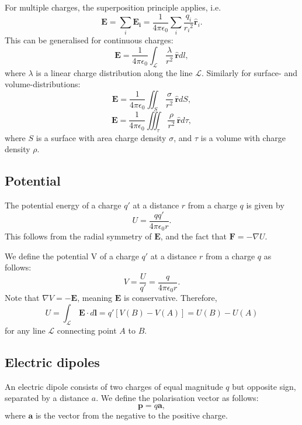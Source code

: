 \documentclass[a4paper, 12pt]{article}
\renewcommand{\vec}[1]{\mathbf{#1}}
\newcommand{\E}{\ensuremath{\vec{E}}}
\newcommand{\e}{\ensuremath{\epsilon_0}}
\let\tmp\hat
\renewcommand{\hat}[1]{\vec{\tmp{#1}}}
\begin{document}
    For multiple charges, the superposition principle applies, i.e. 
    \begin{equation}
        \E = \sum_i\vec{E_i} = \frac{1}{4\pi\e}\sum_i\frac{q_i}{{r_i}^2}\hat{r}_i.
    \end{equation}
    This can be generalised for continuous charges: 
    \begin{equation}
        \E = \frac{1}{4\pi\e}\int_\mathcal{L}\,\frac{\lambda}{r^2}\,\hat{r}dl,
    \end{equation}
    where $\lambda$ is a linear charge distribution along the line $\mathcal{L}$. Similarly for surface- and volume-distributions: 
    \begin{equation}
        \E = \frac{1}{4\pi\e}\iint_S\,\frac{\sigma}{r^2}\,\hat{r}dS,
    \end{equation}
    \begin{equation}
        \E = \frac{1}{4\pi\e}\iiint_{\tau}\,\frac{\rho}{r^2}\,\hat{r}d\tau,
    \end{equation}
    where $S$ is a surface with area charge density $\sigma$, and $\tau$ is a volume with charge density $\rho$.
    
\subsection{Potential}
    The potential energy of a charge $q'$ at a distance $r$ from a charge $q$ is given by
    \begin{equation}
        U = \frac{qq'}{4\pi\e r}.
    \end{equation}
    This follows from the radial symmetry of \E, and the fact that $\vec{F} = - \nabla U$.
    
    
    We define the potential V of a charge $q'$ at a distance $r$ from a charge $q$ as follows: 
    \begin{equation}
        V = \frac{U}{q'} = \frac{q}{4\pi\e r}.
    \end{equation}
    Note that $\nabla V = -\E$, meaning $\E$ is conservative. Therefore, 
    \begin{equation}
        U = \int_\mathcal{L}\,\E\cdot d\vec{l} = q'[V(B) - V(A)] = U(B) - U(A)
    \end{equation}
    for any line $\mathcal{L}$ connecting point $A$ to $B$.

\subsection{Electric dipoles}
    An electric dipole consists of two charges of equal magnitude $q$ but opposite sign, separated by a distance $a$. 
    We define the polarisation vector as follows: 
    \begin{equation}
        \vec{p} = q\vec{a},
    \end{equation}
    where $\vec{a}$ is the vector from the negative  to the positive charge. 
    
\end{document}

